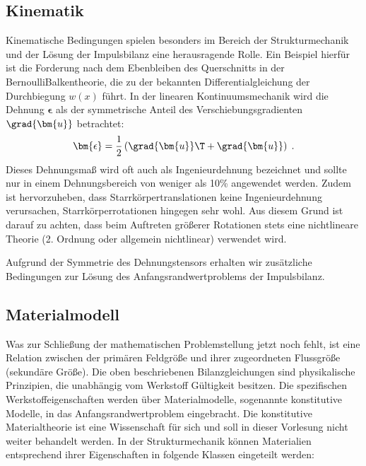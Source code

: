 \documentclass[letterpaper,10pt,german]{jupyterBook}
\begin{document}
\subsection{Kinematik}
\label{\detokenize{chapters/chapter1/elasticity:kinematik}}
\sphinxAtStartPar
Kinematische Bedingungen spielen besonders im Bereich der Strukturmechanik und der Lösung der Impulsbilanz eine herausragende Rolle. Ein Beispiel hierfür ist die Forderung nach dem Ebenbleiben des Querschnitts in der Bernoulli\sphinxhyphen{}Balkentheorie, die zu der bekannten Differentialgleichung der Durchbiegung \(w(x)\) führt.
In der linearen Kontinuumsmechanik wird die Dehnung \(\bm{\epsilon}\) als der symmetrische Anteil des Verschiebungsgradienten \(\grad{\bm{u}}\) betrachtet:
\begin{equation}\label{equation:chapters/chapter1/elasticity:linearStrain}
\begin{split}\bm{\epsilon} = \frac{1}{2} \left(\grad{\bm{u}}\T + \grad{\bm{u}} \right) \; .\end{split}
\end{equation}
\sphinxAtStartPar
Dieses Dehnungsmaß wird oft auch als Ingenieurdehnung bezeichnet und sollte nur in einem Dehnungsbereich von weniger als 10\% angewendet werden. Zudem ist hervorzuheben, dass Starrkörpertranslationen keine Ingenieurdehnung verursachen, Starrkörperrotationen hingegen sehr wohl. Aus diesem Grund ist darauf zu achten, dass beim Auftreten größerer Rotationen stets eine nichtlineare Theorie (2. Ordnung oder allgemein nichtlinear) verwendet wird.

\sphinxAtStartPar
Aufgrund der Symmetrie des Dehnungstensors erhalten wir  zusätzliche Bedingungen zur Lösung des Anfangsrandwertproblems der Impulsbilanz.


\subsection{Materialmodell}
\label{\detokenize{chapters/chapter1/elasticity:materialmodell}}
\sphinxAtStartPar
Was zur Schließung der mathematischen Problemstellung jetzt noch fehlt, ist eine Relation zwischen der primären Feldgröße und ihrer zugeordneten Flussgröße (sekundäre Größe). Die oben beschriebenen Bilanzgleichungen sind physikalische Prinzipien, die unabhängig vom Werkstoff Gültigkeit besitzen. Die spezifischen Werkstoffeigenschaften werden über Materialmodelle, sogenannte konstitutive Modelle, in das Anfangsrandwertproblem eingebracht. Die konstitutive Materialtheorie ist eine Wissenschaft für sich und soll in dieser Vorlesung nicht weiter behandelt werden. In der Strukturmechanik können Materialien entsprechend ihrer Eigenschaften in folgende Klassen eingeteilt werden:
\end{document}
